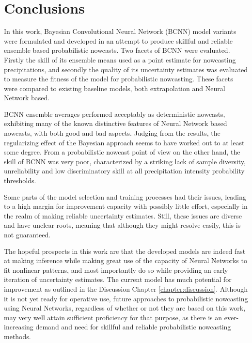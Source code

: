 \chapter{Conclusions}
\label{chapter:conclusions}


In this work, Bayesian Convolutional Neural Network (BCNN) model variants were formulated and developed in an attempt to produce skillful and reliable ensemble based probabilistic nowcasts. Two facets of BCNN were evaluated. Firstly the skill of its ensemble means used as a point estimate for nowcasting precipitations, and secondly the quality of its uncertainty estimates was evaluated to measure the fitness of the model for probabilistic nowcasting. These facets were compared to existing baseline models, both extrapolation and Neural Network based. 

BCNN ensemble averages performed acceptably as deterministic nowcasts, exhibiting many of the known distinctive features of Neural Network based nowcasts, with both good and bad aspects. Judging from the results, the regularizing effect of the Bayesian approach seems to have worked out to at least some degree. From a probabilistic nowcast point of view on the other hand, the skill of BCNN was very poor, characterized by a striking lack of sample diversity, unreliability and low discriminatory skill at all precipitation intensity probability thresholds.

Some parts of the model selection and training processes had their issues, leading to a high margin for improvement capacity with possibly little effort, especially in the realm of making reliable uncertainty estimates. Still, these issues are diverse and have unclear roots, meaning that although they might resolve easily, this is not guaranteed. 

The hopeful prospects in this work are that the developed models are indeed fast at making inference while making great use of the capacity of Neural Networks to fit nonlinear patterns, and most importantly do so while providing an early iteration of uncertainty estimates. The current model has much potential for improvement as outlined in the Discussion Chapter \ref{chapter:discussion}. Although it is not yet ready for operative use, future approaches to probabilistic nowcasting using Neural Networks, regardless of whether or not they are based on this work, may very well attain sufficient proficiency for that purpose, as there is an ever-increasing demand and need for skillful and reliable probabilistic nowcasting methods.